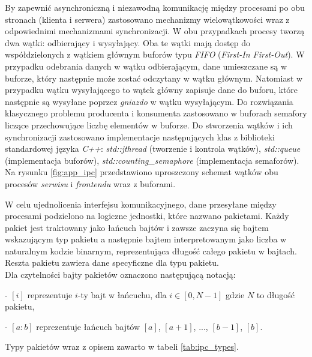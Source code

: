 By zapewnić asynchroniczną i niezawodną komunikację między procesami po obu stronach (klienta i serwera) zastosowano mechanizmy wielowątkowości wraz z odpowiednimi mechanizmami synchronizacji.
W obu przypadkach procesy tworzą dwa wątki: odbierający i wysyłający. Oba te wątki mają dostęp
do współdzielonych z wątkiem głównym buforów typu \textit{FIFO} (\textit{First-In First-Out}).
W przypadku odebrania danych w wątku odbierającym, dane umieszczane są w buforze, 
który następnie może zostać odczytany w wątku głównym. Natomiast w przypadku wątku wysyłającego
to wątek główny zapisuje dane do buforu, które następnie są wysyłane poprzez \textit{gniazdo} w 
wątku wysyłającym. Do rozwiązania klasycznego problemu producenta i konsumenta 
zastosowano w buforach semafory liczące przechowujące liczbę elementów w buforze.
Do stworzenia wątków i ich synchronizacji zastosowano implementacje następujących klas
z biblioteki standardowej języka \textit{C++}: \textit{std::jthread} (tworzenie i kontrola wątków), 
\textit{std::queue} (implementacja buforów), \textit{std::counting\_semaphore} 
(implementacja semaforów). Na rysunku \ref{fig:app_ipc} przedstawiono uproszczony schemat wątków
obu procesów \textit{serwisu} i \textit{frontendu} wraz z buforami.


W celu ujednolicenia interfejsu komunikacyjnego, dane przesyłane między procesami podzielono
na logiczne jednostki, które nazwano pakietami. Każdy pakiet jest traktowany jako łańcuch bajtów
i zawsze zaczyna się bajtem wskazującym typ pakietu a następnie bajtem interpretowanym jako liczba
w naturalnym kodzie binarnym, reprezentująca długość całego pakietu w bajtach. Reszta pakietu
zawiera dane specyficzne dla typu pakietu.\\ 
Dla czytelności bajty pakietów oznaczono następującą notacją: 

- $[i]$ reprezentuje $i$-ty bajt w łańcuchu, dla $i \in [0, N-1]$ gdzie $N$ to długość pakietu,

- $[a:b]$ reprezentuje łańcuch bajtów $[a]$, $[a+1]$, $...$, $[b-1]$, $[b]$. 

Typy pakietów wraz z opisem zawarto w tabeli \ref{tab:ipc_types}.

